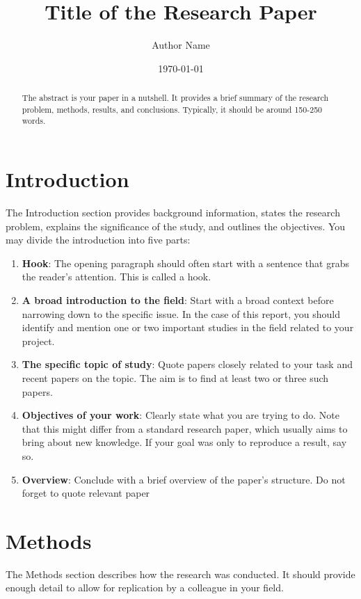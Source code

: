 \documentclass[a4paper,12pt]{article}
\title{Title of the Research Paper}
\author{Author Name}
\date{\today}
\begin{document}
\maketitle

\begin{abstract}
The abstract is your paper in a nutshell. It provides a brief summary of the research problem, methods, results, and conclusions. Typically, it should be around 150-250 words.
\end{abstract}

\section{Introduction}
The Introduction section provides background information, states the research problem, explains the significance of the study, and outlines the objectives. You may divide the introduction into five parts:
\begin{enumerate}
    \item \textbf{Hook}: The opening paragraph should often start with a sentence that grabs the reader's attention. This is called a hook.
    \item \textbf{A broad introduction to the field}: Start with a broad context before narrowing down to the specific issue. In the case of this report, you should identify and mention one or two important studies in the field related to your project.
    \item \textbf{The specific topic of study}: Quote papers closely related to your task and recent papers on the topic. The aim is to find at least two or three such papers.
    \item \textbf{Objectives of your work}: Clearly state what you are trying to do. Note that this might differ from a standard research paper, which usually aims to bring about new knowledge. If your goal was only to reproduce a result, say so.
    \item \textbf{Overview}: Conclude with a brief overview of the paper's structure.
    Do not forget to quote relevant paper\autocite{lotka1920analytical}
\end{enumerate}

\section{Methods}
The Methods section describes how the research was conducted. It should provide enough detail to allow for replication by a colleague in your field. 
\end{document}
